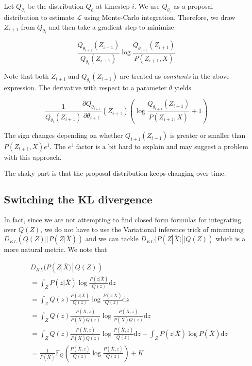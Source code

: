 \documentclass{article}
\begin{document}
Let \(Q_{\theta_i}\) be the distribution \(Q_{\theta}\) at timestep \(i\).
We use \(Q_{\theta_i}\) as a proposal distribution to estimate \(\mathcal{L}\)
using Monte-Carlo integration. Therefore, we draw \(Z_{i+1}\) from
\(Q_{\theta_i}\) and then take a gradient step to minimize

\[
  \frac{Q_{\theta_{i+1}}(Z_{i+1})}{Q_{\theta_i}(Z_{i+1})} \log
  \frac{Q_{\theta_{i+1}}(Z_{i+1})}{P(Z_{i+1},X)}
\]

Note that both \(Z_{i+1}\) and \(Q_{\theta_i}(Z_{i+1})\) are treated as
\emph{constants} in the above expression. The derivative with respect
to a parameter \(\theta\) yields

\[
  \frac{1}{Q_{\theta_i}(Z_{i+1})}
    \frac{\partial Q_{\theta_{i+1}}}{\partial \theta_{i+1}}(Z_{i+1})
    \left( \log \frac{Q_{\theta_{i+1}}(Z_{i+1})}{P(Z_{i+1},X)} + 1 \right)
\]

The sign changes depending on whether \(Q_{t+1}(Z_{t+1})\) is greater or
smaller than \(P(Z_{t+1},X) e^{1}\). The \(e^{1}\) factor is a bit hard
to explain and may suggest a problem with this approach.

The shaky part is that the proposal distribution keeps changing over time.

\subsection{Switching the KL divergence}

In fact, since we are not attempting to find closed form formulas for
integrating over \(Q(Z)\), we do not have to use the Variational inference
trick of minimizing \(D_{KL}(Q(Z)||P(Z|\overline{X}))\) and we can tackle
\(D_{KL}(P(Z|\overline{X})||Q(Z))\) which is a more natural metric. We note that

\[
\begin{aligned}
  & D_{KL}(P(Z|\overline{X})|| Q(Z)) \\
  &= \int_Z P(z|\overline{X}) \log \frac{P(z|\overline{X})}{Q(z)} \mathrm{d}z \\
  &= \int_Z Q(z) \frac{P(z|\overline{X})}{Q(z)} \log \frac{P(z|\overline{X})}{Q(z)}  \mathrm{d}z \\
  &= \int_Z Q(z) \frac{P(\overline{X}, z)}{P(\overline{X})Q(z)} \log \frac{P(\overline{X}, z)}{P(\overline{X})Q(z)}  \mathrm{d}z \\
  &= \int_Z Q(z) \frac{P(\overline{X}, z)}{P(\overline{X})Q(z)} \log \frac{P(\overline{X}, z)}{Q(z)}  \mathrm{d}z
  - \int_Z P(z|\overline{X}) \log P(\overline{X})  \mathrm{d}z \\
  &= \frac{1}{P(\overline{X})}\mathbb{E}_{Q} \left( \frac{P(\overline{X}, z)}{Q(z)} \log \frac{P(\overline{X}, z)}{Q(z)}\right) + K
\end{aligned}
\]
\end{document}
